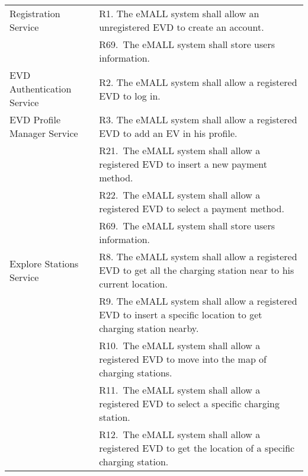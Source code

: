 \begin{center}
    \begin{longtable}{p{0.3\linewidth}p{0.7\linewidth}}
        \hline
        Registration Service                   & R1. The eMALL system shall allow an unregistered EVD to create an account.                                                                      \\
        & R69.\ The eMALL system shall store users information.                                                                                           \\
        \hline
        EVD Authentication Service             & R2. The eMALL system shall allow a registered EVD to log in.                                                                                    \\
        \hline
        EVD Profile Manager Service            & R3. The eMALL system shall allow a registered EVD to add an EV in his profile.                                                                  \\
        & R21.\ The eMALL system shall allow a registered EVD to insert a new payment method.                                                             \\
        & R22.\ The eMALL system shall allow a registered EVD to select a payment method.                                                                 \\
        & R69.\ The eMALL system shall store users information.                                                                                           \\
        \hline
        Explore Stations Service               & R8. The eMALL system shall allow a registered EVD to get all the charging station near to his current location.                                 \\
        & R9. The eMALL system shall allow a registered EVD to insert a specific location to get charging station nearby.                                 \\
        & R10.\ The eMALL system shall allow a registered EVD to move into the map of charging stations.                                                  \\
        & R11.\ The eMALL system shall allow a registered EVD to select a specific charging station.                                                      \\
        & R12.\ The eMALL system shall allow a registered EVD to get the location of a specific charging station.                                         \\

\end{longtable}
\end{center}
